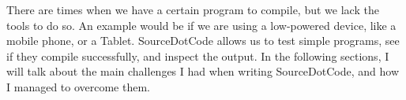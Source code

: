 
There are times when we have a certain program to compile, but we lack the tools to do so. An example would be if we are using a low-powered device, like a mobile phone, or a Tablet. SourceDotCode allows us to test simple programs, see if they compile successfully, and inspect the output. In the following sections, I will talk about the main challenges I had when writing SourceDotCode, and how I managed to overcome them.


